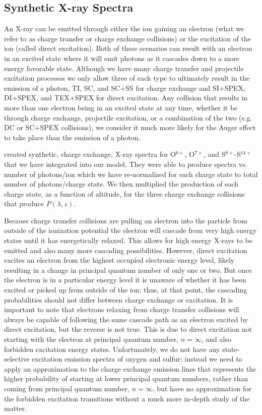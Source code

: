 \documentclass[draft]{agujournal2018}
\begin{document}
\subsection{Synthetic X-ray Spectra}
\label{sec:XraySpec}

An X-ray can be emitted through either the ion gaining an electron (what we refer to as charge transfer or charge exchange collisions) or the excitation of the ion (called direct excitation).
Both of these scenarios can result with an electron in an excited state where it will emit photons as it cascades down to a more energy favorable state.
Although we have many charge transfer and projectile excitation processes we only allow three of each type to ultimately result in the emission of a photon, TI, SC, and SC+SS for charge exchange and SI+SPEX, DI+SPEX, and TEX+SPEX for direct excitation.
Any collision that results in more than one electron being in an excited state at any time, whether it be through charge exchange, projectile excitation, or a combination of the two (e.g. DC or SC+SPEX collisions), we consider it much more likely for the Auger effect to take place than the emission of a photon.

\citet{hui2010} created synthetic, charge exchange, X-ray spectra for O$^{6+}$, O$^{7+}$, and S$^{6+}$-S$^{14+}$ that we have integrated into our model.
They were able to produce spectra vs. number of photons/ion which we have re-normalized for each charge state to total number of photons/charge state.
We then multiplied the production of each charge state, as a function of altitude, for the three charge exchange collisions that produce $P(\lambda,z)$.

Because charge transfer collisions are pulling an electron into the particle from outside of the ionization potential the electron will cascade from very high energy states until it has energetically relaxed.
This allows for high energy X-rays to be emitted and also many more cascading possibilities.
However, direct excitation excites an electron from the highest occupied electronic energy level, likely resulting in a change in principal quantum number of only one or two.
But once the electron is in a particular energy level it is unaware of whether it has been excited or picked up from outside of the ion; thus, at that point, the cascading probabilities should not differ between charge exchange or excitation.
It is important to note that electrons relaxing from charge transfer collisions will always be capable of following the same cascade path as an electron excited by direct excitation, but the reverse is not true.
This is due to direct excitation not starting with the electron at principal quantum number, $n=\infty$, and also forbidden excitation energy states.
Unfortunately, we do not have any state-selective excitation emission spectra of oxygen and sulfur; instead we need to apply an approximation to the charge exchange emission lines that represents the higher probability of starting at lower principal quantum numbers, rather than coming from principal quantum number, $n=\infty$, but have no approximation for the forbidden excitation transitions without a much more in-depth study of the matter.
\end{document}
